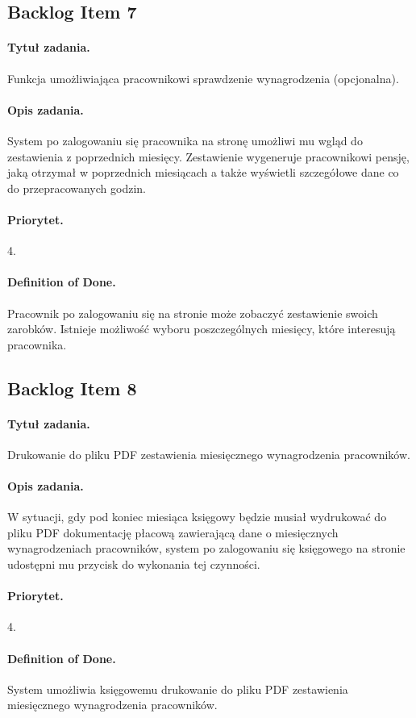 \documentclass[a4paper]{article}
\begin{document}
\subsection{Backlog Item 7}
\paragraph{Tytuł zadania.} Funkcja umożliwiająca pracownikowi sprawdzenie wynagrodzenia (opcjonalna).
\paragraph{Opis zadania.} System po zalogowaniu się pracownika na stronę umożliwi mu wgląd do zestawienia z poprzednich miesięcy. Zestawienie wygeneruje pracownikowi pensję, jaką otrzymał w poprzednich miesiącach a także wyświetli szczegółowe dane co do przepracowanych godzin.
\paragraph{Priorytet.} 4.
\paragraph{Definition of Done.} Pracownik po zalogowaniu się na stronie może zobaczyć zestawienie swoich zarobków. Istnieje możliwość wyboru poszczególnych miesięcy, które interesują pracownika.

\subsection{Backlog Item 8}
\paragraph{Tytuł zadania.} Drukowanie do pliku PDF zestawienia miesięcznego wynagrodzenia pracowników.
\paragraph{Opis zadania.} W sytuacji, gdy pod koniec miesiąca księgowy będzie musiał wydrukować do pliku PDF dokumentację płacową zawierającą dane o miesięcznych wynagrodzeniach pracowników, system po zalogowaniu się księgowego na stronie udostępni mu przycisk do wykonania tej czynności.
\paragraph{Priorytet.} 4.
\paragraph{Definition of Done.} System umożliwia księgowemu drukowanie do pliku PDF zestawienia miesięcznego wynagrodzenia pracowników.
\end{document}

